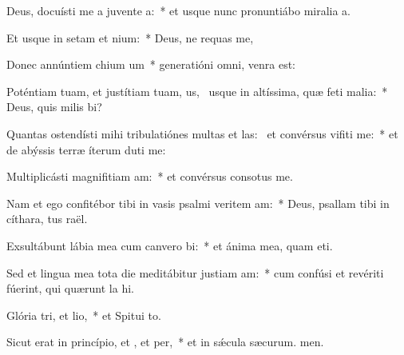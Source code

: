 \item Deus, docuísti me a juvente a:~* et usque nunc pronuntiábo miralia a.
\item Et usque in setam et nium:~* Deus, ne requas me,
\item Donec annúntiem chium um~* generatióni omni,  venra est:
\item Poténtiam tuam, et justítiam tuam, us,~\pscross{} usque in altíssima, quæ feti malia:~* Deus, quis milis bi?
\item Quantas ostendísti mihi tribulatiónes multas et las:~\pscross{} et convérsus vifiti me:~* et de abýssis terræ íterum duti me:
\item Multiplicásti magnifitiam am:~* et convérsus consotus  me.
\item Nam et ego confitébor tibi in vasis psalmi veritem am:~* Deus, psallam tibi in cíthara, tus raël.
\item Exsultábunt lábia mea cum canvero bi:~* et ánima mea, quam eti.
\item Sed et lingua mea tota die meditábitur justiam am:~* cum confúsi et revériti fúerint, qui quærunt la hi.
\item Glória tri, et lio,~* et Spitui to.
\item Sicut erat in princípio, et , et per,~* et in sǽcula sæcurum. men.
